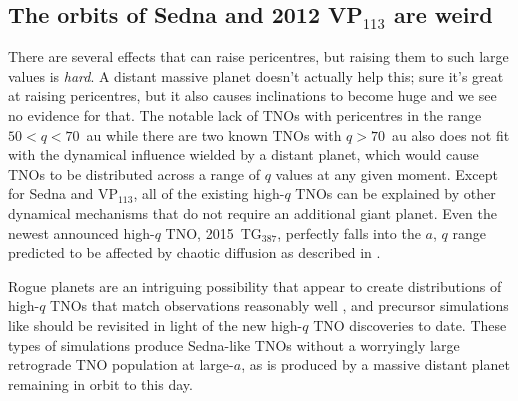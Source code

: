 \documentclass[preprint]{aastex62}
\begin{document}
\subsection{The orbits of Sedna and 2012 VP$_{113}$ are weird}

There are several effects that can raise pericentres, but raising them
to such large values is {\em hard}.  
A distant massive planet doesn't actually help this; sure it's great
at raising pericentres, but it also causes inclinations to become huge
and we see no evidence for that.  The notable lack of TNOs with pericentres in the range $50<q<70$~au while there are two known TNOs with $q>70$~au also does not fit with 
the dynamical influence wielded by a distant planet, which would cause TNOs to be distributed across a range of $q$ values at any given moment.
Except for Sedna and VP$_{113}$, all
of the existing high-$q$ TNOs can be explained by other dynamical
mechanisms that do not require an additional giant planet.  Even the
newest announced high-$q$ TNO, 2015~TG$_{387}$, perfectly falls into
the $a$, $q$ range predicted to be affected by chaotic diffusion as
described in \citet{bannister17}.

Rogue planets are an intriguing possibility that appear to create distributions of high-$q$ TNOs that match observations reasonably well \citep{lawler2018,silsbee18}, and precursor simulations like \citet{gladmanchan06} should be revisited in light of
the new high-$q$ TNO discoveries to date.  These types of simulations
produce Sedna-like TNOs without a worryingly large retrograde TNO population at large-$a$, as is produced by a massive distant planet remaining in orbit to this day.

% 



\end{document}
